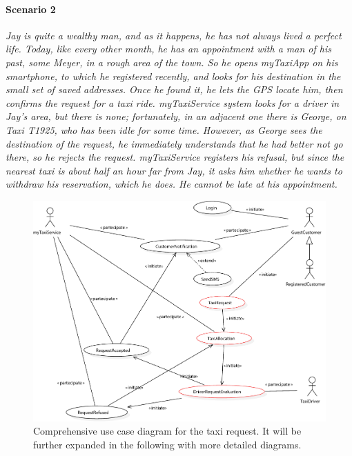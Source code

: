 \paragraph{Scenario 2}{\small\itshape Jay is quite a wealthy man, and as it happens, he has not always lived a perfect life. Today, like every other month, he has an appointment with a man of his past, some Meyer, in a rough area of the town. So he opens myTaxiApp on his smartphone, to which he registered recently, and looks for his destination in the small set of saved addresses. Once he found it, he lets the GPS locate him, then confirms the request for a taxi ride. myTaxiService system looks for a driver in Jay's area, but there is none; fortunately, in an adjacent one there is George, on Taxi T1925, who has been idle for some time. However, as George sees the destination of the request, he immediately understands that he had better not go there, so he rejects the request. myTaxiService registers his refusal, but since the nearest taxi is about half an hour far from Jay, it asks him whether he wants to withdraw his reservation, which he does. He cannot be late at his appointment.}


\begin{figure}%
	\includegraphics[width=\textwidth]{img/U_TaxiRequestGLOBAL}%
	\caption{Comprehensive use case diagram for the taxi request. It will be further expanded in the following with more detailed diagrams.}%
\end{figure}	


